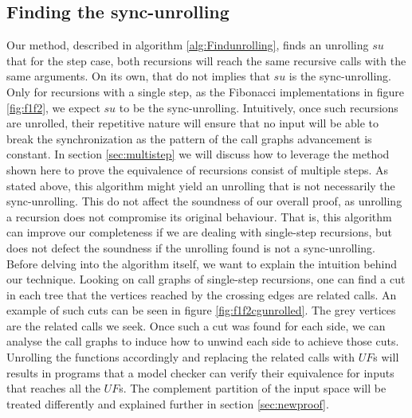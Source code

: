 \subsection{Finding the sync-unrolling}
Our method, described in algorithm \ref{alg:Findunrolling}, finds an unrolling $su$ that for the step case, both recursions will reach the same recursive calls with the same arguments. On its own, that do not implies that $su$ is the sync-unrolling. 
Only for recursions with a single step, as the Fibonacci implementations in figure \ref{fig:f1f2}, we expect $su$ to be the sync-unrolling. Intuitively, once such recursions are unrolled, their repetitive nature will ensure that no input will be able to break the synchronization as the pattern of the call graphs advancement is constant. 
In section \ref{sec:multistep} we will discuss how to leverage the method shown here to prove the equivalence of recursions consist of multiple steps.
As stated above, this algorithm might yield an unrolling that is not necessarily the sync-unrolling. This do not affect the soundness of our overall proof, as unrolling a recursion does not compromise its original behaviour. That is, this algorithm can improve our completeness if we are dealing with single-step recursions, but does not defect the soundness if the unrolling found is not a sync-unrolling.
\\Before delving into the algorithm itself, we want to explain the intuition behind our technique. Looking on call graphs of single-step recursions, one can find a cut in each tree that the vertices reached by the crossing edges are related calls. An example of such cuts can be seen in figure \ref{fig:f1f2cgunrolled}. The grey vertices are the related calls we seek. Once such a cut was found for each side, we can analyse the call graphs to induce how to unwind each side to achieve those cuts. Unrolling the functions accordingly and replacing the related calls with $UF$s will results in programs that a model checker can verify their equivalence for inputs that reaches all the $UF$s. The complement partition of the input space will be treated differently and explained further in section \ref{sec:newproof}. 
